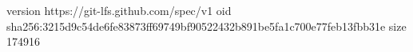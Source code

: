 version https://git-lfs.github.com/spec/v1
oid sha256:3215d9c54de6fe83873ff69749bf90522432b891be5fa1c700e77feb13fbb31e
size 174916
